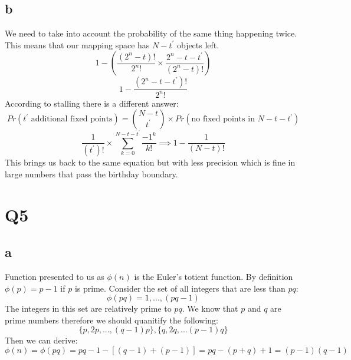 \documentclass[a4paper, 11pt]{article}
\begin{document}
\subsection{b}
We need to take into account the probability of the same thing happening twice.
This means that our mapping space has $N - t^\prime$ objects left.
\begin{equation}
    1 - (\frac{(2^n - t)!}{2^{n}!} \times \frac{2^n - t - t^\prime}{(2^{n} -t)!})
\end{equation}
\begin{equation}
    1 - \frac{(2^n - t - t^\prime)!}{2^{n}!}
\end{equation}
According to stalling there is a different answer:
\begin{equation}
    Pr(t^\prime \text{ additional fixed points}) = {N - t \choose t^\prime} \times
    Pr(\text{no fixed points in } N - t - t^\prime)
\end{equation}
\begin{equation}
    \frac{1}{(t^\prime)!} \times \sum_{k = 0}^{N - t - t^\prime}\frac{-1^{k}}{k!} \implies 1 - \frac{1}{(N - t)!}
\end{equation}
This brings us back to the same equation but with less precision which is fine
in large numbers that pass the birthday boundary.
\section{Q5}
\subsection{a}
Function presented to us as $\phi(n)$ is the Euler's totient function.
By definition $\phi(p) = p-1$ if $p$ is prime. Consider the set of all
integers that are less than $pq$:
\begin{equation}
    \phi(pq) = {1, ..., (pq-1)}
\end{equation}
The integers in this set are relatively prime to $pq$. We know that $p$ and
$q$ are prime numbers therefore we should quanitify the following:
\begin{equation}
    \{p, 2p, ..., (q-1)p\} , \{q, 2q, ... (p-1)q\}
\end{equation}
Then we can derive:
\begin{equation}
    \phi(n) = \phi(pq) = pq - 1 - [(q-1)+(p-1)] = pq - (p+q) + 1 = (p-1)(q-1)
\end{equation}
\end{document}
